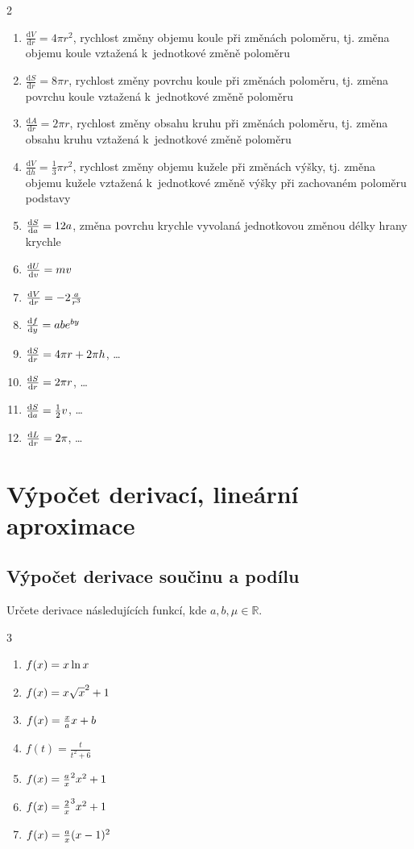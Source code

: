 \reseni
\begin{multicols}2

\begin{enumerate}
\item $\frac{\mathrm dV}{\mathrm dr}=4\pi r^2$, rychlost změny objemu koule při změnách poloměru, tj. změna objemu koule vztažená k jednotkové změně poloměru
\item $\frac{\mathrm dS}{\mathrm dr}=8\pi r$, rychlost změny povrchu koule při změnách poloměru, tj. změna povrchu koule vztažená k jednotkové změně poloměru
\item $\frac{\mathrm dA}{\mathrm dr}=2\pi r$, rychlost změny obsahu kruhu při změnách poloměru, tj. změna obsahu kruhu vztažená k jednotkové změně poloměru
\item $\frac{\mathrm dV}{\mathrm dh}=\frac 13\pi r^2$, rychlost změny objemu kužele při změnách výšky, tj. změna objemu kužele vztažená k jednotkové změně výšky při zachovaném poloměru podstavy
\item $\frac{\mathrm{d}S}{\mathrm{d}a}=12a$, změna povrchu krychle vyvolaná jednotkovou změnou délky hrany krychle
\item $\frac{\mathrm{d}U}{\mathrm{d}v}=mv$ 
\item $\frac{\mathrm{d}V}{\mathrm{d}r}=-2\frac{a}{r^3}$
\item $\frac{\mathrm{d}f}{\mathrm{d}y}=abe^{by}$
\item $\frac{\mathrm{d}S}{\mathrm{d}r}=4\pi r+2\pi h$, \dots
\item $\frac{\mathrm{d}S}{\mathrm{d}r}=2\pi r$, \dots
\item $\frac{\mathrm{d}S}{\mathrm{d}a}=\frac 12v$, \dots
\item $\frac{\mathrm{d}L}{\mathrm{d}r}=2\pi$, \dots
\end{enumerate}
\end{multicols}

\konec



\stranka
\section{Výpočet derivací, lineární aproximace}


  \stranka 
  \def\der #1.{$\vphantom{\frac 11}f(x)=#1$}
\subsection{Výpočet derivace součinu a podílu}
Určete derivace následujících funkcí, kde $a,b,\mu\in\mathbb{R}$.
\begin{multicols}3
\begin{enumerate}
\item \der x\ln x.
\item \der x\sqrt{x^2+1}.
\item \der \frac {x}{ax+b}.
\item $f(t)=\frac{t}{t^2+6}$
\item \der \frac{ax^2}{x^2+1}.
\item \der \frac {2x^3}{x^2+1}.
\item \der \frac {ax}{(x-1)^2}.
\end{enumerate}
\end{multicols}

